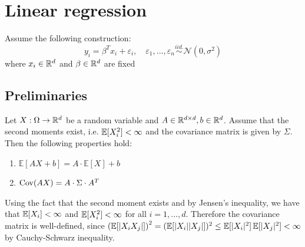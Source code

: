 \section{Linear regression} \label{sec:linear_regression}
Assume the following construction:
\[y_i = \beta^T x_i + \varepsilon_i, \quad \varepsilon_1, ..., \varepsilon_n \overset{iid.}{\sim} \mathcal{N}(0, \sigma^2)\]
where $x_i \in \mathbb{R}^d$ and $\beta \in \mathbb{R}^d$ are fixed

\subsection{Preliminaries}
\begin{lemma}                                                                      
    Let $X: \Omega \to \mathbb{R}^d$ be a random variable and $A \in \mathbb{R}^{d \times d}, b \in \mathbb{R}^d$. Assume that the second moments exist, i.e. $\operatorname{\mathbb{E}} [X_i^2] < \infty$ and the covariance matrix is given by $\Sigma$. Then the following properties hold:
    \begin{enumerate}[label=Property \thelemma.\arabic*, align=left]
        \item \label{prop:expectation linearity} $\mathbb{E}[AX + b] = A \cdot \mathbb{E}[X] + b$
        \item \label{prop:covariance linearity} $\operatorname{Cov} (AX) = A \cdot \Sigma \cdot A^T$
    \end{enumerate}
\end{lemma}
\begin{remark}                                                    
    Using the fact that the second moment exists and by Jensen's inequality, we have that $\operatorname{\mathbb{E}}[X_i] < \infty$ and $\operatorname{\mathbb{E}}[X_i^2] < \infty$ for all $i = 1, ..., d$. Therefore the covariance matrix is well-defined, since $\left(\operatorname{\mathbb{E}} [|X_i X_j|]\right)^2 = (\operatorname{\mathbb{E}} [|X_i| |X_j|])^2 \leq \operatorname{\mathbb{E}} [|X_i|^2] \operatorname{\mathbb{E}} [|X_j|^2] < \infty$ by Cauchy-Schwarz inequality.
\end{remark}
